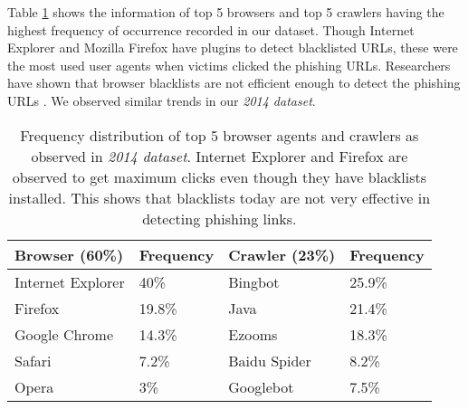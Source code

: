 \documentclass[conference]{IEEEtran}
\begin{document}
Table \ref{tab:user_agent} shows the information of top 5 browsers and top 5 crawlers having the highest frequency of occurrence recorded in our dataset. Though Internet Explorer and Mozilla Firefox have plugins to detect blacklisted URLs, these were the most used user agents when victims clicked the phishing URLs. Researchers have shown that browser blacklists are not efficient enough to detect the phishing URLs \cite{egelman} \cite{sheng}. We observed similar trends in our \textit{2014 dataset}.

\begin{table}[h]
\centering
\caption{Frequency distribution of top 5 browser agents and crawlers as observed in \textit{2014 dataset}. Internet Explorer and Firefox are observed to get maximum clicks even though they have blacklists installed. This shows that blacklists today are not very effective in detecting phishing links.} \label{tab:user_agent}
\begin{small}
\begin{tabular}{|p{2cm}|p{1.20cm}|p{1.75cm}|p{1.5cm}|} \hline
\small Browser (60\%) &\small Frequency &\small Crawler (23\%) &\small Frequency\\ \hline
Internet Explorer & 40\% & Bingbot & 25.9\% \\ \hline
Firefox & 19.8\% & Java & 21.4\% \\ \hline
Google Chrome & 14.3\% & Ezooms & 18.3\% \\ \hline
Safari & 7.2\% & Baidu Spider & 8.2\% \\ \hline
Opera & 3\%	& Googlebot & 7.5\% \\ \hline
\end{tabular}
\end{small}
\end{table}
\end{document}
